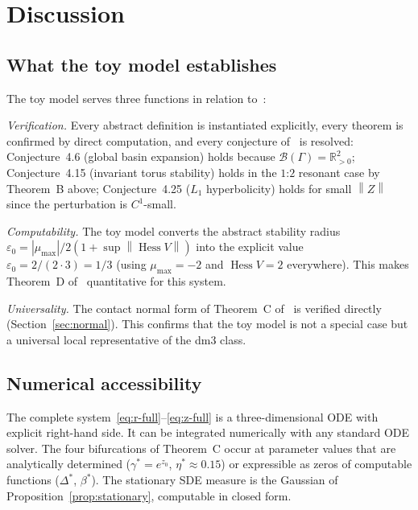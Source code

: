 \documentclass[reqno]{amsart}
\numberwithin{equation}{section}
\theoremstyle{plain}
\theoremstyle{definition}
\theoremstyle{remark}
\newcommand{\R}{\mathbb{R}}
\newcommand{\Orb}{\Gamma}
\newcommand{\cB}{\mathcal{B}}
\newcommand{\norm}[1]{\left\|#1\right\|}
\newcommand{\abs}[1]{\left|#1\right|}
\DeclareMathOperator{\Hess}{Hess}
\begin{document}
\section{Discussion}\label{sec:discussion}

\subsection{What the toy model establishes}

The toy model serves three functions in relation to~\cite{Paper1}:

\emph{Verification.} Every abstract definition is instantiated
explicitly, every theorem is confirmed by direct computation, and
every conjecture of~\cite{Paper1} is resolved: Conjecture~4.6
(global basin expansion) holds because $\cB(\Orb)=\R^2_{>0}$;
Conjecture~4.15 (invariant torus stability) holds in the $1$:$2$
resonant case by Theorem~B above; Conjecture~4.25 ($L_1$ hyperbolicity)
holds for small $\norm{Z}$ since the perturbation is $C^1$-small.

\emph{Computability.} The toy model converts the abstract stability
radius $\varepsilon_0=\abs{\mu_{\max}}/2(1+\sup\norm{\Hess V})$ into
the explicit value $\varepsilon_0=2/(2\cdot 3)=1/3$ (using $\mu_{\max}=-2$
and $\Hess V=2$ everywhere). This makes Theorem~D of~\cite{Paper1}
quantitative for this system.

\emph{Universality.} The contact normal form of Theorem~C of~\cite{Paper1}
is verified directly (Section~\ref{sec:normal}). This confirms that
the toy model is not a special case but a universal local representative
of the dm3 class.

\subsection{Numerical accessibility}

The complete system~\eqref{eq:r-full}--\eqref{eq:z-full} is a three-dimensional
ODE with explicit right-hand side. It can be integrated numerically
with any standard ODE solver. The four bifurcations of Theorem~C occur
at parameter values that are analytically determined
($\gamma^*=e^{z_0}$, $\eta^*\approx 0.15$) or expressible as zeros
of computable functions ($\Delta^*$, $\beta^*$). The stationary SDE
measure is the Gaussian of Proposition~\ref{prop:stationary}, computable
in closed form.
\end{document}
